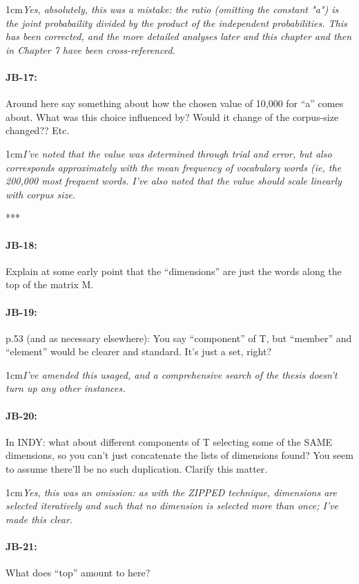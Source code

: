 \documentclass[11pt,a4paper]{article}
\newcommand{\res}[1]{\vspace{0.25cm} \begin{adjustwidth}{1cm}{}\emph{#1}\end{adjustwidth}}
\begin{document}
\res{Yes, absolutely, this was a mistake: the ratio (omitting the constant "a") is the joint probabaility divided by the product of the independent probabilities.  This has been corrected, and the more detailed analyses later and this chapter and then in Chapter 7 have been cross-referenced.}

\paragraph{JB-17:} Around here say something about how the chosen value of 10,000 for ``a'' comes about. What was this choice influenced by? Would it change of the corpus-size changed?? Etc.

\res{I've noted that the value was determined through trial and error, but also corresponds approximately with the mean frequency of vocabulary words (ie, the 200,000 most frequent words.  I've also noted that the value should scale linearly with corpus size.}

***\paragraph{JB-18:} Explain at some early point that the ``dimensions'' are just the words along the top of the matrix M.

\paragraph{JB-19:} p.53 (and as necessary elsewhere): You say ``component'' of T, but ``member'' and ``element'' would be clearer and standard. It's just a set, right?

\res{I've amended this usaged, and a comprehensive search of the thesis doesn't turn up any other instances.}

\paragraph{JB-20:} In INDY: what about different components of T selecting some of the SAME dimensions, so you can't just concatenate the lists of dimensions found? You seem to assume there'll be no such duplication. Clarify this matter.

\res{Yes, this was an omission: as with the ZIPPED technique, dimensions are selected iteratively and such that no dimension is selected more than once; I've made this clear.}

\paragraph{JB-21:} What does ``top'' amount to here?
\end{document}
